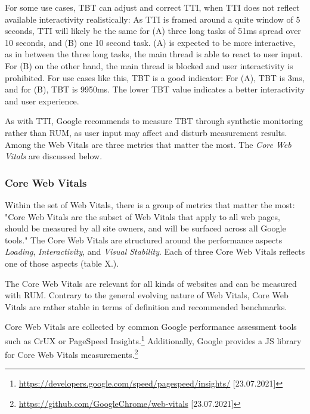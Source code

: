 
For some use cases, TBT can adjust and correct TTI, when TTI does not reflect available interactivity realistically:
As TTI is framed around a quite window of 5 seconds, TTI will likely be the same for (A) three long tasks of 51ms spread over 10 seconds, and (B) one 10 second task.
(A) is expected to be more interactive, as in between the three long tasks, the main thread is able to react to user input.
For (B) on the other hand, the main thread is blocked and user interactivity is prohibited.
For use cases like this, TBT is a good indicator:
For (A), TBT is 3ms, and for (B), TBT is 9950ms.
The lower TBT value indicates a better interactivity and user experience.

As with TTI, Google recommends to measure TBT through synthetic monitoring rather than RUM, as user input may affect and disturb measurement results.  \\









Among the Web Vitals are three metrics that matter the most.
The \textit{Core Web Vitals} are discussed below.





\subsubsection{Core Web Vitals}

Within the set of Web Vitals, there is a group of metrics that matter the most:
"Core Web Vitals are the subset of Web Vitals that apply to all web pages, should be measured by all site owners, and will be surfaced across all Google tools." %
The Core Web Vitals are structured around the performance aspects \textit{Loading}, \textit{Interactivity}, and \textit{Visual Stability}.
Each of three Core Web Vitals reflects one of those aspects (table X.).

The Core Web Vitals are relevant for all kinds of websites and can be measured with RUM.
Contrary to the general evolving nature of Web Vitals, Core Web Vitals are rather stable in terms of definition and recommended benchmarks.

Core Web Vitals are collected by common Google performance assessment tools such as CrUX or PageSpeed Insights.\footnote{\url{https://developers.google.com/speed/pagespeed/insights/} [23.07.2021]}
Additionally, Google provides a JS library for Core Web Vitals measurements.\footnote{\url{https://github.com/GoogleChrome/web-vitals} [23.07.2021]}

